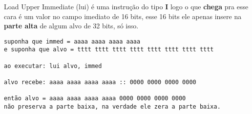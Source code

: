 \documentclass{article}
\begin{document}
Load Upper Immediate (lui) é uma instrução do tipo \textbf{I} logo o que
\textbf{chega} pra esse cara é um valor no campo imediato de 16 bits, esse 16
bits ele apenas insere na \textbf{parte alta} de algum alvo de 32 bits, só isso.

\begin{verbatim}
suponha que immed = aaaa aaaa aaaa aaaa
e suponha que alvo = tttt tttt tttt tttt tttt tttt tttt tttt

ao executar: lui alvo, immed

alvo recebe: aaaa aaaa aaaa aaaa :: 0000 0000 0000 0000

então alvo = aaaa aaaa aaaa aaaa 0000 0000 0000 0000
não preserva a parte baixa, na verdade ele zera a parte baixa.
\end{verbatim}
\end{document}
